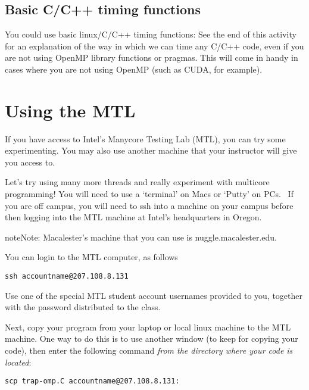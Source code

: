 \documentclass[letterpaper,10pt,openany,oneside]{sphinxmanual}
\begin{document}
\subsection{Basic C/C++ timing functions}
\label{timingAndScalability/TimingOnMTLandscalability:basic-c-c-timing-functions}
You could use basic linux/C/C++ timing functions: See the end of this
activity for an explanation of the way in which we can time any C/C++
code, even if you are not using OpenMP library functions or pragmas. This will come in handy in cases where you are not using OpenMP (such as CUDA, for example).


\section{Using the MTL}
\label{timingAndScalability/TimingOnMTLandscalability:using-the-mtl}
If you have access to Intel's Manycore Testing Lab (MTL), you can try some experimenting.  You may also use another machine that your instructor will give you access to.

Let’s try using many more threads and really experiment with multicore
programming! You will need to use a ‘terminal’ on Macs or ‘Putty’ on
PCs.  If you are off campus, you will need to ssh into a machine on your campus before
then logging into the MTL machine at Intel’s headquarters in Oregon.

\begin{notice}{note}{Note:}
Macalester's machine that you can use is nuggle.macalester.edu.
\end{notice}

You can login to the MTL computer, as follows

\begin{Verbatim}[commandchars=\\\{\}]
ssh accountname@207.108.8.131
\end{Verbatim}

Use one of the special MTL student account usernames provided to you, together with
the password distributed to the class.

Next, copy your program from your laptop or local linux machine to the MTL machine.
One way to do this is to use another window (to
keep for copying your code), then enter the following command \emph{from the directory where your code is located}:

\begin{Verbatim}[commandchars=\\\{\}]
scp trap-omp.C accountname@207.108.8.131:
\end{Verbatim}
\end{document}

